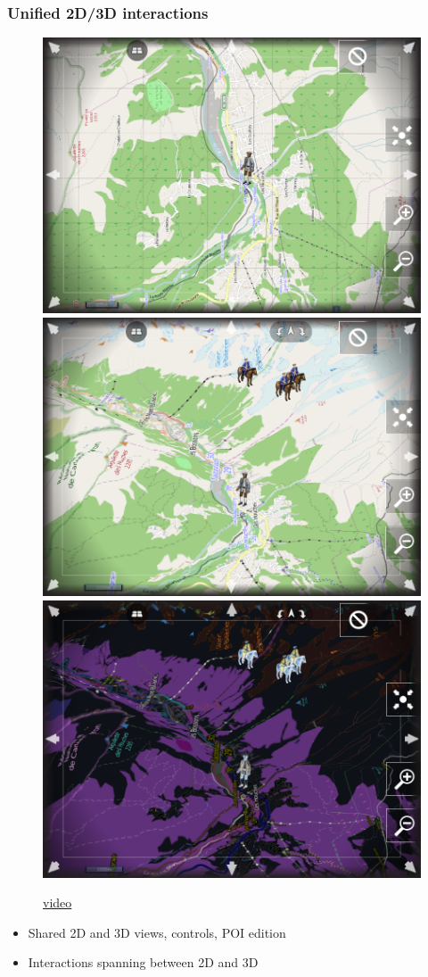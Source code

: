 \documentclass{beamer}
\begin{document}
  
  \begin{frame}
    \frametitle{Unified 2D/3D interactions}
    \begin{figure}
    \begin{center}
    \href{https://penta.fosdem.org/event/attachment/2871/61}{
      \includegraphics[width=.33\linewidth]{./video1.png}
      \includegraphics[width=.33\linewidth]{./video2.png}
      \includegraphics[width=.33\linewidth]{./video3.png}
     }
    \end{center}
    \href{https://penta.fosdem.org/event/attachment/2871/61}{video}
    \end{figure}

    \pause
    \begin{itemize}
     \item Shared 2D and 3D views, controls, POI   edition
     \item Interactions spanning between 2D and 3D
    \end{itemize}
  \end{frame}
\end{document}
